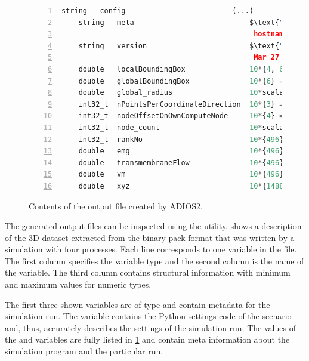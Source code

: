 \begin{figure}
\centering
\begin{framed}
\begin{lstlisting}[basicstyle=\footnotesize\ttfamily,commentstyle=\color{gray},numbers=left,language=python]
    string   config                         (...)
    string   meta                           $\text{"}$current time: 2021/3/30 19:48:05,$\textcolor{gray}{\hookleftarrow}$
                                             hostname: lapsgs05, n ranks: 4$\text{"}$
    string   version                        $\text{"}$opendihu 1.2, built $\textcolor{gray}{\hookleftarrow}$
                                             Mar 27 2021, C++ 201402, GCC 7.5.0$\text{"}$
    double   localBoundingBox               10*{4, 6} = -56.3 / 19.7732   $\label{alg:7.6}$
    double   globalBoundingBox              10*{6} = -56.3 / 19.7732     $\label{alg:7.7}$
    double   global_radius                  10*scalar = 0.1 / 0.1
    int32_t  nPointsPerCoordinateDirection  10*{3} = 4 / 31
    int32_t  nodeOffsetOnOwnComputeNode     10*{4} = 0 / 368
    int32_t  node_count                     10*scalar = 496 / 496
    int32_t  rankNo                         10*{496} = 0 / 3                 $\label{alg:7.12}$
    double   emg                            10*{496} = -12.0536 / 4.89757    $\label{alg:7.13}$
    double   transmembraneFlow              10*{496} = -125.014 / 226.428    $\label{alg:7.14}$
    double   vm                             10*{496} = -81.3198 / -27.4762   $\label{alg:7.15}$
    double   xyz                            10*{1488} = -56.3 / 19.7732      $\label{alg:7.16}$
\end{lstlisting}
\end{framed}
\caption{Contents of the output file created by ADIOS2.}%
\label{fig:adios_output}%
\end{figure}             

The generated output files can be inspected using the  utility.  shows a description of the 3D dataset extracted from the binary-pack format that was written by a simulation with four processes.
Each line corresponds to one variable in the file. The first column specifies the variable type and the second column is the name of the variable. The third column contains structural information with minimum and maximum values for numeric types. 

The first three shown variables are of type  and contain metadata for the simulation run. The  variable contains the Python settings code of the scenario and, thus, accurately describes the settings of the simulation run. 
The values of the  and  variables are fully listed in \cref{fig:adios_output} and contain meta information about the simulation program and the particular run. 

